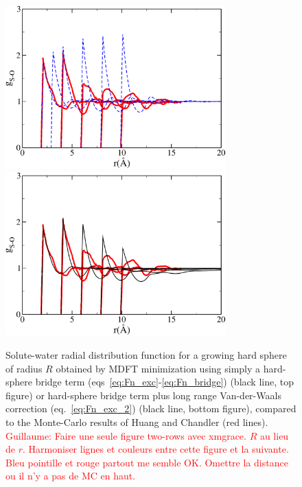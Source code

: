 \documentclass[aip,jcp,preprint]{revtex4-1}
\begin{document}
\begin{figure}
    \includegraphics[width=8.5cm]{comp_MD_MDFT_ChandlerSys_HSB_SPC.pdf}\\
    \includegraphics[width=8.5cm]{comp_MD_MDFT_ChandlerSys_VdW_a12p3m0p9_SPC.pdf}
    \caption{
        \label{fig:gr_Chandler}
        Solute-water radial distribution function for a growing hard sphere of radius $R$ obtained by MDFT minimization using simply a hard-sphere bridge term (eqs~\ref{eq:Fn_exc}-\ref{eq:Fn_bridge}) (black line, top figure) or hard-sphere bridge term plus long range Van-der-Waals correction (eq.~\ref{eq:Fn_exc_2}) (black line, bottom figure), compared to the Monte-Carlo results of Huang and Chandler\cite{huang02} (red lines). 
        \textcolor{red}{Guillaume: Faire une seule figure two-rows avec xmgrace. $R$ au lieu de $r$. Harmoniser lignes et couleurs entre cette figure et la suivante. Bleu pointille et rouge partout me semble OK.  Omettre la distance ou il n'y a pas de MC en haut.}
        }
\end{figure}
\end{document}

